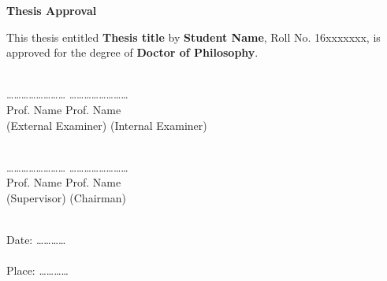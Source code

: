 \documentclass[12pt, a4paper, twoside, openright]{Thesis} %
\begin{document}
{

\vspace{-1in}
\begin{center}
{\Large  {\bf Thesis Approval}}
\end{center}
\vspace*{0.1in} \noindent This thesis entitled {\large \bf Thesis title} by {\bf \large
Student Name}, Roll No. 16xxxxxxx, is approved for the degree of  {\large \bf Doctor of Philosophy}.\\\\

\vspace{3cm}

 \ldots\ldots \ldots\ldots \ldots\ldots \ldots\ldots  \hspace{2.5in}  \ldots\ldots \ldots\ldots \ldots\ldots \ldots\ldots \\
 \hspace*{1cm} Prof. Name \hspace{3.4in} Prof. Name\\
 \hspace*{0.2cm} (External Examiner) \hspace{2.8in} (Internal Examiner)\\\\

\vspace{2cm}

 \ldots\ldots \ldots\ldots \ldots\ldots \ldots\ldots  \hspace{2.5in}  \ldots\ldots \ldots\ldots \ldots\ldots \ldots\ldots \\
 \hspace*{1cm} Prof. Name \hspace{3.4in} Prof. Name\\
 \hspace*{0.9cm} (Supervisor) \hspace{3.39in} (Chairman)\\\\

\vspace{2cm}

\noindent
Date: \ldots\ldots \ldots \ldots\\\\
Place: \ldots\ldots \ldots \ldots


}
\end{document}
